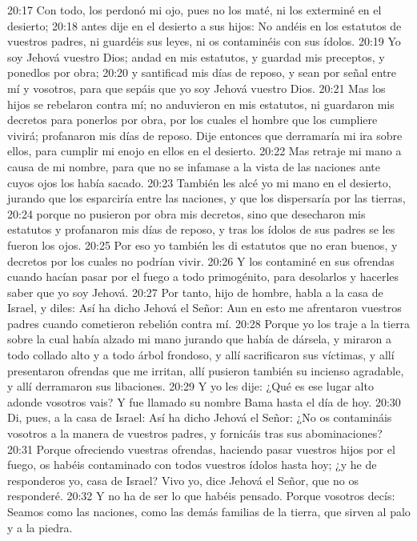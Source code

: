 20:17 Con todo, los perdonó mi ojo, pues no los maté, ni los exterminé en el desierto;   
20:18 antes dije en el desierto a sus hijos: No andéis en los estatutos de vuestros padres, ni guardéis sus leyes, ni os contaminéis con sus ídolos. 
20:19 Yo soy Jehová vuestro Dios; andad en mis estatutos, y guardad mis preceptos, y ponedlos por obra;   
20:20 y santificad mis días de reposo, y sean por señal entre mí y vosotros, para que sepáis que yo soy Jehová vuestro Dios.   
20:21 Mas los hijos se rebelaron contra mí; no anduvieron en mis estatutos, ni guardaron mis decretos para ponerlos por obra, por los cuales el hombre que los cumpliere vivirá; profanaron mis días de reposo. Dije entonces que derramaría mi ira sobre ellos, para cumplir mi enojo en ellos en el desierto.   
20:22 Mas retraje mi mano a causa de mi nombre, para que no se infamase a la vista de las naciones ante cuyos ojos los había sacado.   
20:23 También les alcé yo mi mano en el desierto, jurando que los esparciría entre las naciones, y que los dispersaría por las tierras, 
20:24 porque no pusieron por obra mis decretos, sino que desecharon mis estatutos y profanaron mis días de reposo, y tras los ídolos de sus padres se les fueron los ojos.   
20:25 Por eso yo también les di estatutos que no eran buenos, y decretos por los cuales no podrían vivir.   
20:26 Y los contaminé en sus ofrendas cuando hacían pasar por el fuego a todo primogénito, para desolarlos y hacerles saber que yo soy Jehová.   
20:27 Por tanto, hijo de hombre, habla a la casa de Israel, y diles: Así ha dicho Jehová el Señor: Aun en esto me afrentaron vuestros padres cuando cometieron rebelión contra mí.   
20:28 Porque yo los traje a la tierra sobre la cual había alzado mi mano jurando que había de dársela, y miraron a todo collado alto y a todo árbol frondoso, y allí sacrificaron sus víctimas, y allí presentaron ofrendas que me irritan, allí pusieron también su incienso agradable, y allí derramaron sus libaciones.   
20:29 Y yo les dije: ¿Qué es ese lugar alto adonde vosotros vais? Y fue llamado su nombre Bama hasta el día de hoy.   
20:30 Di, pues, a la casa de Israel: Así ha dicho Jehová el Señor: ¿No os contamináis vosotros a la manera de vuestros padres, y fornicáis tras sus abominaciones?   
20:31 Porque ofreciendo vuestras ofrendas, haciendo pasar vuestros hijos por el fuego, os habéis contaminado con todos vuestros ídolos hasta hoy; ¿y he de responderos yo, casa de Israel? Vivo yo, dice Jehová el Señor, que no os responderé.   
20:32 Y no ha de ser lo que habéis pensado. Porque vosotros decís: Seamos como las naciones, como las demás familias de la tierra, que sirven al palo y a la piedra.   
